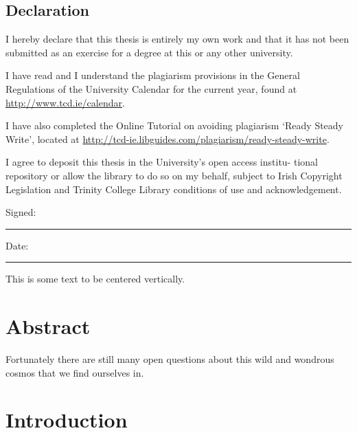\documentclass[a4paper]{book}
\numberwithin{equation}{section}
\begin{document}



\hspace{0pt}
\vfill
\section*{Declaration}
I hereby declare that this thesis is entirely my own work and that it has not been submitted as an exercise for a degree at this or any other university.

I have read and I understand the plagiarism provisions in the General Regulations of the University Calendar for the current year, found at \url{http://www.tcd.ie/calendar}.

I have also completed the Online Tutorial on avoiding plagiarism `Ready Steady Write', located at \url{http://tcd-ie.libguides.com/plagiarism/ready-steady-write}.

I agree to deposit this thesis in the University’s open access institu-
tional repository or allow the library to do so on my behalf, subject
to Irish Copyright Legislation and Trinity College Library conditions
of use and acknowledgement.
\vspace{1cm}

Signed:~\rule{5cm}{0.3pt}\hfill Date:~\rule{5cm}{0.3pt}

This is some text to be centered vertically.
\vfill
\hspace{0pt}




\newpage
\chapter*{Abstract}
Fortunately there are still many open questions about this wild and wondrous cosmos that we find ourselves in.

\tableofcontents
\listoffigures
\listoftables



\chapter{Introduction}
\end{document}
